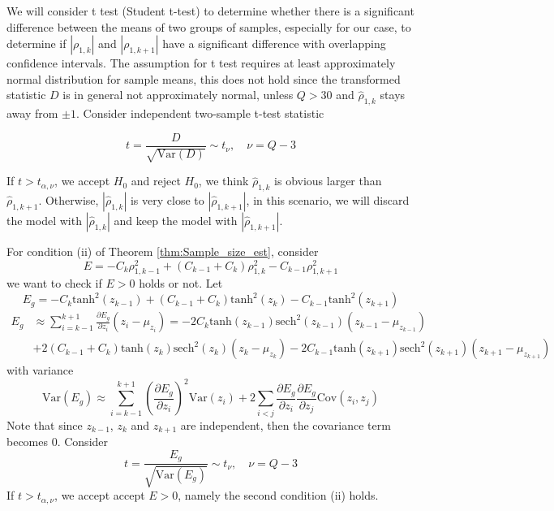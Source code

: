 We will consider t test (Student t-test) to determine whether there is a significant difference between the means of two groups of samples, especially for our case, to determine if  $| \rho_{1,k}|$ and $|\rho_{1,k+1}|$ have a significant difference  with overlapping confidence intervals. The assumption for t test requires at least approximately normal distribution for sample means, this does not hold since the transformed statistic $D$ is in general not approximately normal, unless $Q>30$ and $\widehat \rho_{1,k}$ stays away from $\pm 1$. Consider independent two-sample t-test statistic



\[
t = \frac{D}{\sqrt{\text{Var}(D)}} \sim t_\nu, \quad \nu = Q-3
\]








If $t>t_{\alpha,\nu}$, we accept $H_0$ and reject $H_0$, we think $\widehat \rho_{1,k}$ is obvious larger than $\widehat \rho_{1,k+1}$. Otherwise, $|\widehat \rho_{1,k}|$ is very close to $|\widehat \rho_{1,k+1}|$, in this scenario, we will discard the model with $|\widehat \rho_{1,k}|$ and keep the model with $|\widehat \rho_{1,k+1}|$.

For condition (ii) of Theorem \ref{thm:Sample_size_est}, consider
\[
E = -C_{k}\rho_{1,k-1}^2+(C_{k-1} + C_k)\rho_{1,k}^2  - C_{k-1}\rho_{1,k+1}^2 
\]
we want to check if $E>0$ holds or not. Let
\[
E_g = -C_{k}\text{tanh}^2(z_{k-1}) + (C_{k-1} + C_k)\text{tanh}^2(z_{k})-C_{k-1}\text{tanh}^2(z_{k+1})
\]
\begin{align*}
    E_g &\approx \sum_{i=k-1}^{k+1}\frac{\partial E_g}{\partial z_i}(z_i-\mu_{z_i})=-2C_k\text{tanh}(z_{k-1})\text{sech}^2(z_{k-1})(z_{k-1}-\mu_{z_{k-1}})\\
    &+2(C_{k-1} + C_k)\text{tanh}(z_{k})\text{sech}^2(z_{k})(z_{k}-\mu_{z_{k}}) - 2C_{k-1}\text{tanh}(z_{k+1})\text{sech}^2(z_{k+1})(z_{k+1}-\mu_{z_{k+1}})
\end{align*}
with variance
\[
\text{Var}(E_g)\approx \sum_{i=k-1}^{k+1}\left(\frac{\partial E_g}{\partial z_i}\right)^2 \text{Var}(z_i) + 2\sum_{i<j}\frac{\partial E_g}{\partial z_i}\frac{\partial E_g}{\partial z_j}\text{Cov}(z_i,z_j)
\]
Note that since $z_{k-1}$, $z_k$ and $z_{k+1}$ are independent, then the covariance term becomes 0. Consider
\[
t=\frac{E_g}{\sqrt{\text{Var}(E_g)}} \sim t_\nu, \quad \nu = Q-3
\]
If $t>t_{\alpha,\nu}$, we accept accept $E>0$, namely the second condition (ii) holds.


